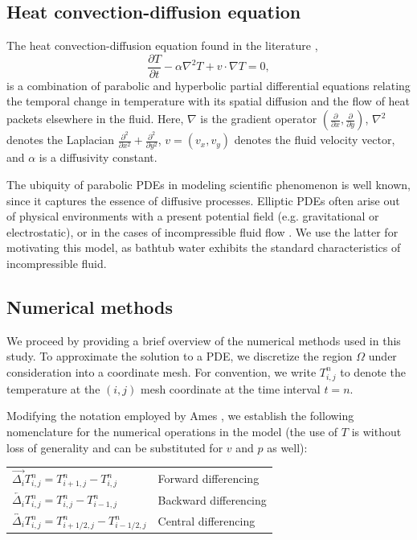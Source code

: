 \documentclass[12pt]{amsart}
\newcommand{\la}{\overleftarrow}
\newcommand{\ra}{\overrightarrow}
\newcommand{\ca}{\overleftrightarrow}
\begin{document}
\subsection{Heat convection-diffusion equation}

The heat convection-diffusion equation found in the literature
\cite{convection-diffusion},
\begin{equation}
    \frac{\partial T}{\partial t} - \alpha \nabla^2 T + v \cdot \nabla T =
    0,
    \label{eq:\theequation}
\end{equation}
is a combination of parabolic and hyperbolic partial differential equations
relating the temporal change in temperature with its spatial diffusion and
the flow of heat packets elsewhere in the fluid.     Here, $\nabla$ is the
gradient operator $\left( \frac{\partial}{\partial x},
\frac{\partial}{\partial y} \right)$, $\nabla^2$ denotes the Laplacian
$\frac{\partial^2}{\partial x^2} + \frac{\partial^2}{\partial y^2}$, $v =
(v_x, v_y)$ denotes the fluid velocity vector, and $\alpha$ is a diffusivity
constant.

The ubiquity of parabolic PDEs in modeling scientific phenomenon is well
known, since it captures the essence of diffusive processes. Elliptic PDEs
often arise out of physical environments with a present potential field
(e.g.  gravitational or electrostatic), or in the cases of incompressible
fluid flow \cite{convection-diffusion, ames}. We use the latter for
motivating this model, as bathtub water exhibits the standard
characteristics of incompressible fluid.

\subsection{Numerical methods}

We proceed by providing a brief overview of the numerical methods used in
this study. To approximate the solution to a PDE, we discretize the region
$\Omega$ under consideration into a coordinate mesh. For convention, we
write $T_{i,j}^{n}$ to denote the temperature at the $(i,j)$ mesh coordinate
at the time interval $t=n$. 

Modifying the notation employed by Ames \cite{ames}, we establish the
following nomenclature for the numerical operations in the model (the use of $T$
is without loss of generality and can be substituted for $v$ and $p$ as well):

\begin{center}
    \begin{tabular}[]{ll}
        $\ra{\Delta_i} T_{i,j}^n = T_{i+1,j}^n - T_{i,j}^n$ & Forward
        differencing \\
        $\la{\Delta_i} T_{i,j}^n = T_{i,j}^n - T_{i-1,j}^n$ & Backward differencing \\
        $\ca{\Delta_i} T_{i,j}^n = T_{i+1/2,j}^n - T_{i-1/2,j}^n$ & Central differencing
    \end{tabular}
\end{center}
\end{document}
